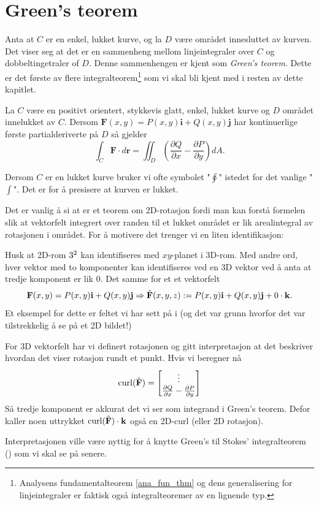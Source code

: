 %
%
%
\section{Green's teorem}
Anta at \( C \) er en enkel, lukket kurve, og la \( D \) være området innesluttet av kurven. Det viser seg at det er en sammenheng mellom linjeintegraler over $C$ og dobbeltingetraler of $D$. 
Denne sammenhengen er kjent som \textit{Green's teorem}. Dette er det første av flere integralteorem\footnote{Analysens fundamentalteorem \eqref{ana_fun_thm} og dens generalisering for linjeintegraler  er faktisk også integralteoremer av en lignende typ.} som vi skal bli kjent med i resten av dette kapitlet. 


\begin{thm}\label{thm:Green}
La \( C \) være en positivt orientert, stykkevis glatt, enkel, lukket kurve og \( D \) området innelukket av \( C \). Dersom \( \mathbf{F}(x,y) = P(x,y)\mathbf{i} + Q(x,y) \mathbf{j} \) har kontinuerlige første partialderiverte på \( D \) så gjelder 
\[
\int_C \mathbf{F} \cdot d\mathbf{r} = \iint_D \left( \frac{\partial Q}{\partial x} - \frac{\partial P}{\partial y} \right) dA.
\]
\end{thm}

\begin{rem}{}
Dersom $C$ er en lukket kurve bruker vi ofte symbolet "$\oint$" istedet for det vanlige "$\int$". Det er for å presisere at kurven er lukket.

Det er vanlig å si at  er et teorem om 2D-rotasjon fordi man kan forstå formelen slik at vektorfelt integrert over randen til et lukket området er lik arealintegral av rotasjonen i området. For å motivere det trenger vi en liten identifikasjon:

Husk at 2D-rom $3^2$ kan identifiseres med $xy$-planet i 3D-rom. Med andre ord, hver vektor med to komponenter kan identifiseres ved en 3D vektor ved å anta at tredje komponent er lik $0$. Det samme for et et vektorfelt
\[\mathbf{F} (x,y)=P(x,y)\mathbf{i}+Q(x,y)\mathbf{j} \Rightarrow \hat{\mathbf{F}}(x,y,z):=P(x,y)\mathbf{i}+Q(x,y)\mathbf{j}+0\cdot \mathbf{k}.\]
Et eksempel for dette er feltet vi har sett på i  (og det var grunn hvorfor det var tilstrekkelig å se på et 2D bildet!)

For 3D vektorfelt har vi definert rotasjonen og gitt interpretasjon at det beskriver hvordan det viser rotasjon rundt et punkt.
Hvis vi beregner nå
\[\mathrm{curl} (\hat{\mathbf{F}}) = \begin{bmatrix} \vdots \\ \frac{\partial Q}{\partial x}-\frac{\partial P}{\partial y}\end{bmatrix}\]
Så tredje komponent er akkurat det vi ser som integrand i Green's teorem. Defor kaller noen uttrykket $\mathrm{curl}(\hat{\mathbf{F}})\cdot \mathbf{k}$ også en 2D-curl (eller 2D rotasjon).

Interpretasjonen ville være nyttig for å knytte Green's  til Stokes'  integralteorem () som vi skal se på senere.
\end{rem}

